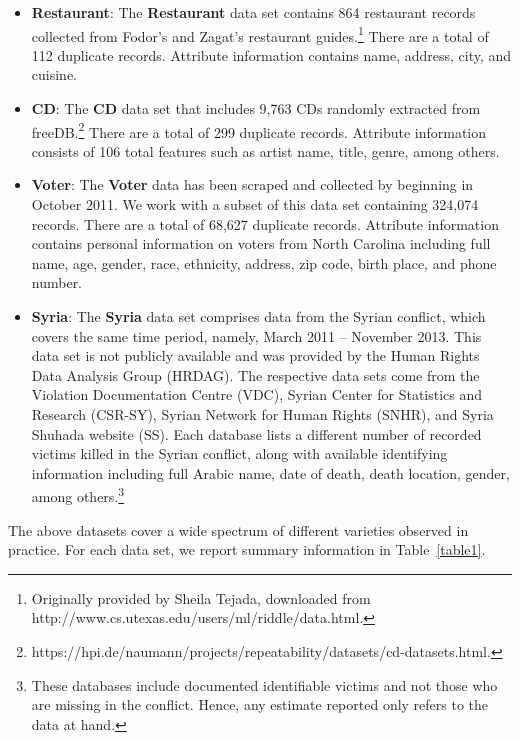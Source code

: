 \documentclass[aoas]{imsart}
\begin{document}
\begin{itemize}
    \item \textbf{Restaurant}: The \textbf{Restaurant} data set contains 864 restaurant records collected from Fodor's and Zagat's restaurant guides.\footnote{Originally provided by Sheila Tejada, downloaded from http://www.cs.utexas.edu/users/ml/riddle/data.html.}  There are a total of 112 duplicate records. Attribute information contains name, address, city, and cuisine.

        \item \textbf{CD}: The \textbf{CD} data set that includes 9,763 CDs randomly extracted from freeDB.\footnote{https://hpi.de/naumann/projects/repeatability/datasets/cd-datasets.html.} There are a total of 299 duplicate records. Attribute information consists of 106 total features such as artist name, title, genre, among others.

    \item \textbf{Voter}: The  \textbf{Voter} data has been scraped and collected by \cite{christen16} beginning in October 2011. We work with a subset of this data set containing 324,074 records. There are a total of 68,627 duplicate records. Attribute information contains personal information on voters from North Carolina including full name, age, gender, race, ethnicity, address, zip code, birth place, and phone number.

    \item \textbf{Syria}: The \textbf{Syria} data set comprises data from the Syrian conflict, which covers the same time period, namely, March 2011 -- November 2013. This data set is not publicly available and was provided by the Human Rights Data Analysis Group (HRDAG). The respective data sets come from the Violation Documentation Centre (VDC), Syrian Center for Statistics and Research (CSR-SY), Syrian Network for Human Rights (SNHR), and Syria Shuhada website (SS). Each database lists a different number of recorded victims killed in the Syrian conflict, along with available identifying information including full Arabic name, date of death, death location, gender, among others.\footnote{These databases include documented identifiable victims and not those who are missing in the conflict. Hence, any estimate reported only refers to the data at hand.}
\end{itemize}

The above datasets cover a wide spectrum of different varieties observed in practice. For each data set, we report summary information in
Table~\ref{table1}.
\end{document}
